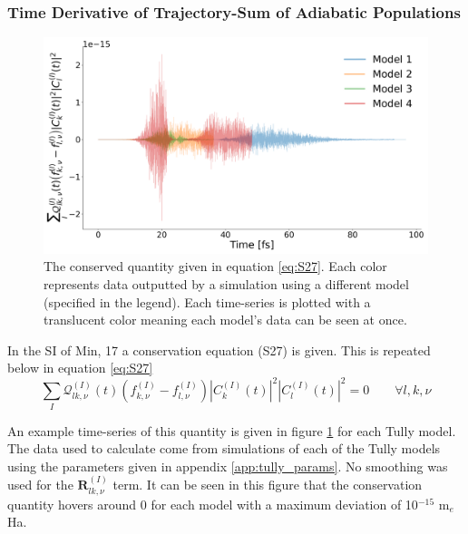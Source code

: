 \subsubsection{Time Derivative of Trajectory-Sum of Adiabatic Populations}
\begin{figure}[h]
	\includegraphics[width=\textwidth]{./img/CTMQC/TullyModels/CTMQC_S27.png}
	\caption{\label{fig:S27}The conserved quantity given in equation \eqref{eq:S27}. Each color represents data outputted by a simulation using a different model (specified in the legend). Each time-series is plotted with a translucent color meaning each model's data can be seen at once.}
\end{figure}

In the SI of Min, 17 \cite{min_ab_2017} a conservation equation (S27) is given. This is repeated below in equation \eqref{eq:S27}
\begin{equation}
	\sum_{I} \mathcal{Q}_{lk, \nu}^{(I)}(t) \left( f_{k, \nu}^{(I)} - f_{l, \nu}^{(I)} \right) |C_{k}^{(I)} (t)|^2 |C_{l}^{(I)} (t)|^2 = 0  \qquad \forall l, k, \nu
	\label{eq:S27}
\end{equation}

An example time-series of this quantity is given in figure \ref{fig:S27} for each Tully model. The data used to calculate come from simulations of each of the Tully models using the parameters given in appendix \ref{app:tully_params}. No smoothing was used for the $\mathbf{R}_{lk, \nu}^{(I)}$ term. It can be seen in this figure that the conservation quantity hovers around 0 for each model with a maximum deviation of 10$^{-15}$ m$_{e}$Ha.

